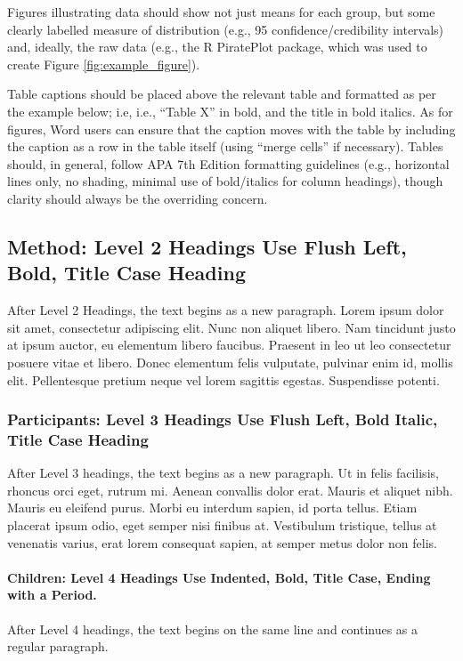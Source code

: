 \documentclass{ldr-article}
\begin{document}
Figures illustrating data should show not just means for each group, but some clearly labelled measure of distribution (e.g., 95 confidence/credibility intervals) and, ideally, the raw data (e.g., the R PiratePlot package, which was used to create Figure \ref{fig:example_figure}).

Table captions should be placed above the relevant table and formatted as per the example below; i.e, i.e., “Table X” in bold, and the title in bold italics. As for figures, Word users can ensure that the caption moves with the table by including the caption as a row in the table itself (using “merge cells” if necessary). Tables should, in general, follow APA 7th Edition formatting guidelines (e.g., horizontal lines only, no shading, minimal use of bold/italics for column headings), though clarity should always be the overriding concern.

\subsection{Method: Level 2 Headings Use Flush Left, Bold, Title Case Heading}
After Level 2 Headings, the text begins as a new paragraph. Lorem ipsum dolor sit amet, consectetur adipiscing elit. Nunc non aliquet libero. Nam tincidunt justo at ipsum auctor, eu elementum libero faucibus. Praesent in leo ut leo consectetur posuere vitae et libero. Donec elementum felis vulputate, pulvinar enim id, mollis elit. Pellentesque pretium neque vel lorem sagittis egestas. Suspendisse potenti. 

\subsubsection{Participants: Level 3 Headings Use Flush Left, Bold Italic, Title Case Heading}

After Level 3 headings, the text begins as a new paragraph. Ut in felis facilisis, rhoncus orci eget, rutrum mi. Aenean convallis dolor erat. Mauris et aliquet nibh. Mauris eu eleifend purus. Morbi eu interdum sapien, id porta tellus. Etiam placerat ipsum odio, eget semper nisi finibus at. Vestibulum tristique, tellus at venenatis varius, erat lorem consequat sapien, at semper metus dolor non felis. 

\paragraph{Children: Level 4 Headings Use Indented, Bold, Title Case, Ending with a Period.}
After Level 4 headings, the text begins on the same line and continues as a regular paragraph.
\end{document}

